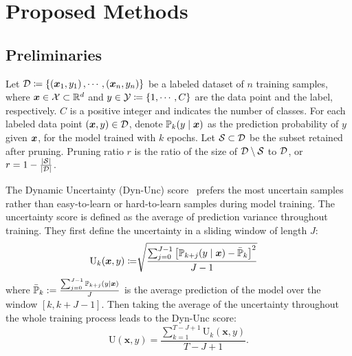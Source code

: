 \section{Proposed Methods}
\subsection{Preliminaries}
Let ${\mathcal{D}} \coloneq \left\{\left(\bm{x}_1, y_1\right), \cdots, \left(\bm{x}_n, y_n\right) \right\}$ be a labeled dataset of $n$ training samples, where $\bm{x}\in{\mathcal{X}} \subset{\mathbb{R}}^d$ and $y\in{\mathcal{Y}} \coloneq\{1, \cdots, C\}$ are the data point and the label, respectively. $C$ is a positive integer and indicates the number of classes. For each labeled data point $({\bm{x}}, y) \in {\mathcal{D}}$, denote ${\mathbb{P}}_k(y \mid {\bm{x}})$ as the prediction probability of $y$ given ${\bm{x}}$, for the model trained with $k$ epochs. Let ${\mathcal{S}}\subset{\mathcal{D}}$ be the subset retained after pruning. Pruning ratio $r$ is the ratio of the size of ${\mathcal{D}}\setminus{\mathcal{S}}$ to ${\mathcal{D}}$, or $r = 1-\frac{\lvert{\mathcal{S}}\rvert}{\lvert{\mathcal{D}}\rvert}$.

The Dynamic Uncertainty (Dyn-Unc) score~\citep{he2024large} prefers the most uncertain samples rather than easy-to-learn or hard-to-learn samples during model training. The uncertainty score is defined as the average of prediction variance throughout training. They first define the uncertainty in a sliding window of length $J$:
\begin{align}
\label{eq:U_score_window}
    \mathrm{U}_k(\bm{x}, y) \coloneq & {\sqrt{\frac{\sum_{j=0}^{J-1}\left[ {\mathbb{P}}_{k+j}(y \mid {\bm{x}}) - \Bar{{\mathbb{P}}}_k \right]^2}{J-1}}}
\end{align}
where $\Bar{{\mathbb{P}}}_k := \frac{\sum_{j=0}^{J-1} {\mathbb{P}}_{k+j}  (y \mid {\bm{x}})}{J}$ is the average prediction of the model over the window $[k, k+J-1]$. Then taking the average of the uncertainty throughout the whole training process leads to the Dyn-Unc score:
\begin{equation}
\label{eq:Dyn_score}
    \mathrm{U}(\bm{x}, y) = \frac{\sum_{k=1}^{T-J+1} \mathrm{U}_k(\bm{x}, y)}{T-J+1}.
\end{equation}

